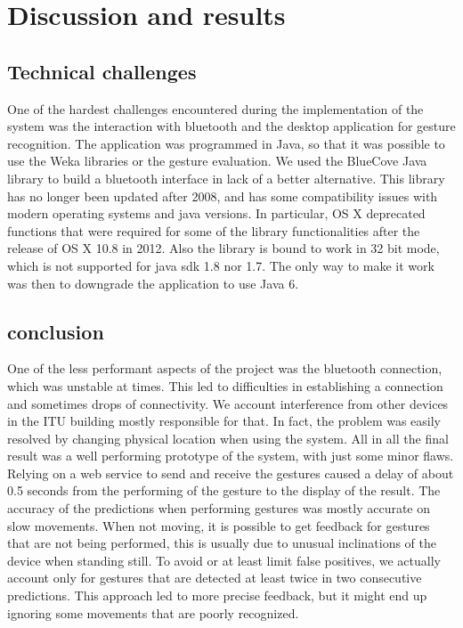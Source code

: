 \section{Discussion and results}

\subsection{Technical challenges}
One of the hardest challenges encountered during the implementation of the system was the interaction with bluetooth and the desktop application for gesture recognition.
The application was programmed in Java, so that it was possible to use the Weka libraries or the gesture evaluation.
We used the BlueCove Java library to build a bluetooth interface \cite{bluecove}  in lack of a better alternative.
This library has no longer been updated after 2008, and has some compatibility issues with modern operating systems and java versions.
In particular, OS X deprecated functions that were required for some of the library functionalities after the release of OS X 10.8 in 2012.
Also the library is bound to work in 32 bit mode, which is not supported for java sdk 1.8 nor 1.7.
The only way to make it work was then to downgrade the application to use Java 6.

\subsection{conclusion}

One of the less performant aspects of the project was the bluetooth connection, which was unstable at times. 
This led to difficulties in establishing a connection and sometimes drops of connectivity.
We account interference from other devices in the ITU building mostly responsible for that. 
In fact, the problem was easily resolved by changing physical location when using the system.
All in all the final result was a well performing prototype of the system, with just some minor flaws.
Relying on a web service to send and receive the gestures caused a delay of about 0.5 seconds from the performing of the gesture to the display of the result.
The accuracy of the predictions when performing gestures was mostly accurate on slow movements. When not moving, it is possible to get feedback for gestures that are not being performed, this is usually due to unusual inclinations of the device when standing still.
To avoid or at least limit false positives, we actually account only for gestures that are detected at least twice in two consecutive predictions. 
This approach led to more precise feedback, but it might end up ignoring some movements that are poorly recognized.
